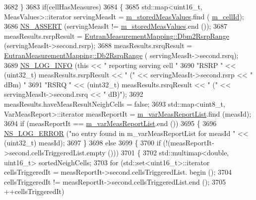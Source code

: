 \begin{DoxyCode}
3682   \}
3683   \textcolor{keywordflow}{if}(cellHasMeasures)
3684   \{
3685     std::map<uint16\_t, MeasValues>::iterator servingMeasIt = \hyperlink{classns3_1_1LteUeRrc_a93094dcd5c235b2e2a8a299125100a57}{m\_storedMeasValues}.find (
      \hyperlink{classns3_1_1LteUeRrc_aa9d3317734eea9158371d9fccf3a0c48}{m\_cellId});
3686     \hyperlink{assert_8h_a6dccdb0de9b252f60088ce281c49d052}{NS\_ASSERT} (servingMeasIt != \hyperlink{classns3_1_1LteUeRrc_a93094dcd5c235b2e2a8a299125100a57}{m\_storedMeasValues}.end ());
3687     measResults.rsrpResult = \hyperlink{classns3_1_1EutranMeasurementMapping_a2c42e6628a24280f58edf8f3814b9d54}{EutranMeasurementMapping::Dbm2RsrpRange}
       (servingMeasIt->second.rsrp);
3688     measResults.rsrqResult = \hyperlink{classns3_1_1EutranMeasurementMapping_adcd875f25361c17646c45695b9b6e8c4}{EutranMeasurementMapping::Db2RsrqRange} (
      servingMeasIt->second.rsrq);
3689     \hyperlink{group__logging_gafbd73ee2cf9f26b319f49086d8e860fb}{NS\_LOG\_INFO} (\textcolor{keyword}{this} << \textcolor{stringliteral}{" reporting serving cell "}
3690                  \textcolor{stringliteral}{"RSRP "} << (uint32\_t) measResults.rsrpResult << \textcolor{stringliteral}{" ("} << servingMeasIt->second.rsrp << \textcolor{stringliteral}{"
       dBm) "}
3691                  \textcolor{stringliteral}{"RSRQ "} << (uint32\_t) measResults.rsrqResult << \textcolor{stringliteral}{" ("} << servingMeasIt->second.rsrq << \textcolor{stringliteral}{"
       dB)"});
3692     measResults.haveMeasResultNeighCells = \textcolor{keyword}{false};
3693     std::map<uint8\_t, VarMeasReport>::iterator measReportIt = 
      \hyperlink{classns3_1_1LteUeRrc_a82da3c138c967761910c02b83724a0e4}{m\_varMeasReportList}.find (measId);
3694     \textcolor{keywordflow}{if} (measReportIt == \hyperlink{classns3_1_1LteUeRrc_a82da3c138c967761910c02b83724a0e4}{m\_varMeasReportList}.end ())
3695     \{
3696       \hyperlink{group__logging_ga0261a8db1d4ac5f79417d117634fd455}{NS\_LOG\_ERROR} (\textcolor{stringliteral}{"no entry found in m\_varMeasReportList for measId "} << (uint32\_t) measId);
3697     \}
3698     \textcolor{keywordflow}{else}
3699     \{
3700       \textcolor{keywordflow}{if} (!(measReportIt->second.cellsTriggeredList.empty ()))
3701         \{
3702           std::multimap<double, uint16\_t> sortedNeighCells;
3703           \textcolor{keywordflow}{for} (std::set<uint16\_t>::iterator cellsTriggeredIt = measReportIt->second.cellsTriggeredList.
      begin ();
3704                cellsTriggeredIt != measReportIt->second.cellsTriggeredList.end ();
3705                ++cellsTriggeredIt)

\end{DoxyCode}
